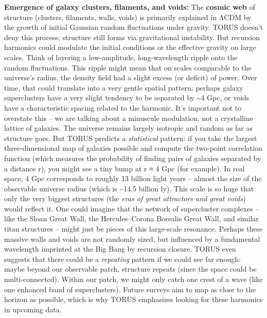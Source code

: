 \textbf{Emergence of galaxy clusters, filaments, and voids:} The
\textbf{cosmic web} of structure (clusters, filaments, walls, voids) is
primarily explained in ΛCDM by the growth of initial Gaussian random
fluctuations under gravity. TORUS doesn't deny this process; structure
still forms via gravitational instability. But recursion harmonics could
modulate the initial conditions or the effective gravity on large
scales. Think of layering a low-amplitude, long-wavelength ripple onto
the random fluctuations. This ripple might mean that on scales
comparable to the universe's radius, the density field had a slight
excess (or deficit) of power. Over time, that could translate into a
very gentle spatial pattern: perhaps galaxy superclusters have a very
slight tendency to be separated by \textasciitilde{}4 Gpc, or voids have
a characteristic spacing related to the harmonic. It's important not to
overstate this -- we are talking about a minuscule modulation, not a
crystalline lattice of galaxies. The universe remains largely isotropic
and random as far as structure goes. But TORUS predicts a
\emph{statistical} pattern: if you take the largest three-dimensional
map of galaxies possible and compute the two-point correlation function
(which measures the probability of finding pairs of galaxies separated
by a distance r), you might see a tiny bump at r ≈ 4 Gpc (for example)​.
In real space, 4 Gpc corresponds to roughly 13 billion light years --
almost the size of the observable universe radius (which is
\textasciitilde{}14.5 billion ly). This scale is so huge that only the
very biggest structures (the \emph{eras of great attractors and great
voids}) would reflect it. One could imagine that the network of
supercluster complexes -- like the Sloan Great Wall, the
Hercules--Corona Borealis Great Wall, and similar titan structures --
might just be pieces of this large-scale resonance. Perhaps these
massive walls and voids are not randomly sized, but influenced by a
fundamental wavelength imprinted at the Big Bang by recursion closure.
TORUS even suggests that there could be a \emph{repeating} pattern if we
could see far enough: maybe beyond our observable patch, structure
repeats (since the space could be multi-connected). Within our patch, we
might only catch one crest of a wave (like one enhanced band of
superclusters). Future surveys aim to map as close to the horizon as
possible, which is why TORUS emphasizes looking for these harmonics in
upcoming data​.


